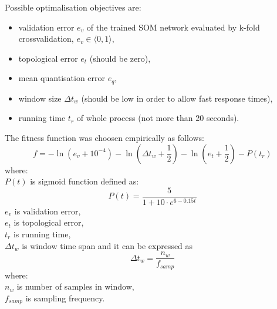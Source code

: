 \documentclass[a4paper,journal]{IEEEtran}
\begin{document}
Possible optimalisation objectives are:
\begin{itemize}
	\item validation error $ e_v $ of the trained SOM network evaluated by k-fold
	crossvalidation, $ e_v \in \langle 0, 1 \rangle $,
	\item topological error $ e_t $ (should be zero),
	\item mean quantisation error $ e_q $,
	\item window size $ \Delta t_w $ (should be low in order to allow fast response times),
	\item running time $ t_r $ of whole process (not more than 20 seconds).
\end{itemize}

The fitness function was choosen empirically as follows:
\[ f = -\ln(e_v+10^{-4}) - \ln(\Delta t_w+\frac{1}{2}) - \ln(e_t+\frac{1}{2}) - P(t_r) \]
where:\\
$ P(t) $ is sigmoid function defined as:
\[ P(t) = \frac{5}{1+10\cdot e^{6-0.15t}} \]
$ e_v $ is validation error,\\
$ e_t $ is topological error,\\
$ t_r $ is running time,\\
$ \Delta t_w $ is window time span and it can be expressed as 
\[  \Delta t_w = \frac{n_w}{f_{samp}}  \]
where:\\
$ n_w $ is number of samples in window,\\
$ f_{samp} $ is sampling frequency.
\end{document}
